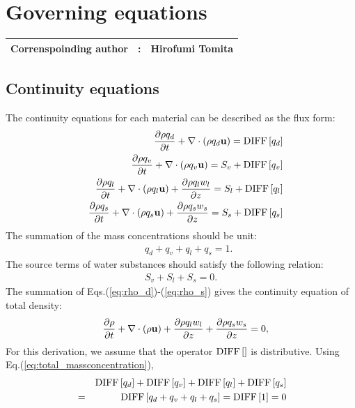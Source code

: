 \chapter{Governing equations}
{\bf \Large 
\begin{tabular}{ccc}
\hline
  Correnspoinding author & : & Hirofumi Tomita\\
\hline
\end{tabular}
}

\section{Continuity equations}

The continuity equations for each material can be described as the flux form:
\begin{eqnarray}
&&  \frac{\partial \rho q_d}{\partial t}
+ \nabla \cdot\left(\rho q_d{\bf u}\right)  = {\rm DIFF}\left[q_d\right]
\label{eq:rho_d}\\
&&  \frac{\partial \rho q_v}{\partial t}
+ \nabla \cdot\left(\rho q_v {\bf u}\right)  = S_v + {\rm DIFF}\left[q_v\right]
\label{eq:rho_v}\\
&&  \frac{\partial \rho q_l}{\partial t}
+ \nabla \cdot\left(\rho q_l {\bf u}\right)
+ \frac{\partial \rho q_l w_l}{\partial z}=S_l + {\rm DIFF}\left[q_l\right]
\label{eq:rho_l}\\
&&  \frac{\partial \rho q_s}{\partial t}
+ \nabla \cdot\left(\rho q_s {\bf u}\right)
+ \frac{\partial \rho q_s w_s}{\partial z}=S_s + {\rm DIFF}\left[q_s\right]
\label{eq:rho_s}
\end{eqnarray}
The summation of the mass concentrations should be unit:
\begin{eqnarray}
&& q_d + q_v + q_l + q_s = 1. \label{eq:total_massconcentration}
\end{eqnarray}
The source terms of water substances should satisfy the following relation:
\begin{eqnarray}
  S_v + S_l + S_s = 0.
\end{eqnarray}
The summation of Eqs.(\ref{eq:rho_d})-(\ref{eq:rho_s}) gives the
continuity equation of total density:
\begin{eqnarray}
&&  \frac{\partial \rho}{\partial t}
+ \nabla\cdot\left(\rho{\bf u}\right) 
+ \frac{\partial \rho q_l w_l}{\partial z}
+ \frac{\partial \rho q_s w_s}{\partial z}
=0, \label{eq:rhotot}
\end{eqnarray}
For this derivation,
we assume that 
the operator ${ \rm DIFF}\left[\right]$ is distributive.
Using Eq.(\ref{eq:total_massconcentration}),
\begin{eqnarray}
&&  { \rm DIFF}\left[q_d\right]
+{ \rm DIFF}\left[q_v\right]
+{ \rm DIFF}\left[q_l\right]
+{ \rm DIFF}\left[q_s\right]\nonumber\\
&=&{ \rm DIFF}\left[q_d+q_v+q_l+q_s\right]
={ \rm DIFF}\left[1\right] = 0
\end{eqnarray}

